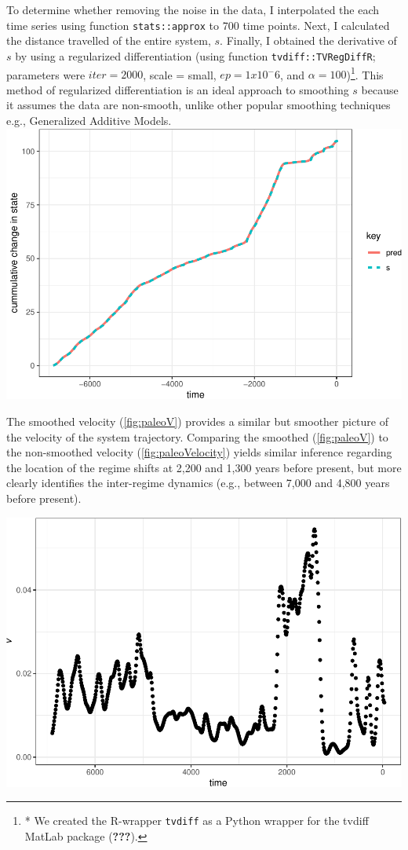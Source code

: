 \documentclass[12pt,twoside,openany]{reedthesis}
\begin{document}
To determine whether removing the noise in the data, I interpolated the
each time series using function \texttt{stats::approx} to 700 time
points. Next, I calculated the distance travelled of the entire system,
\(s\). Finally, I obtained the derivative of \(s\) by using a
regularized differentiation (using function \texttt{tvdiff::TVRegDiffR};
parameters were \(iter = 2000\), scale = small, \(ep = 1 x 10^-6\), and
\(\alpha = 100\))\footnote{* We created the R-wrapper \texttt{tvdiff} as
  a Python wrapper for the tvdiff MatLab package ({\textbf{???}}).}.
This method of regularized differentiation is an ideal approach to
smoothing \(s\) because it assumes the data are non-smooth, unlike other
popular smoothing techniques e.g., Generalized Additive Models.
\includegraphics{_myDissertation_files/figure-latex/paleoObsPred-1.pdf}

The smoothed velocity (\ref{fig:paleoV}) provides a similar but smoother
picture of the velocity of the system trajectory. Comparing the smoothed
(\ref{fig:paleoV}) to the non-smoothed velocity
(\ref{fig:paleoVelocity}) yields similar inference regarding the
location of the regime shifts at 2,200 and 1,300 years before present,
but more clearly identifies the inter-regime dynamics (e.g., between
7,000 and 4,800 years before present).

\includegraphics{_myDissertation_files/figure-latex/paleoV-1.pdf}
\end{document}
